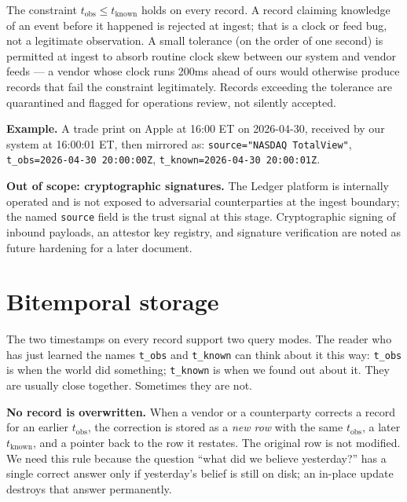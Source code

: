 \documentclass[11pt,a4paper]{article}
\begin{document}
The constraint $t_\text{obs} \le t_\text{known}$ holds on every record. A record claiming knowledge of an event before it happened is rejected at ingest; that is a clock or feed bug, not a legitimate observation. A small tolerance (on the order of one second) is permitted at ingest to absorb routine clock skew between our system and vendor feeds --- a vendor whose clock runs 200ms ahead of ours would otherwise produce records that fail the constraint legitimately. Records exceeding the tolerance are quarantined and flagged for operations review, not silently accepted.

\textbf{Example.} A trade print on Apple at 16:00 ET on 2026-04-30, received by our system at 16:00:01 ET, then mirrored as: \texttt{source="NASDAQ TotalView"}, \texttt{t\_obs=2026-04-30 20:00:00Z}, \texttt{t\_known=2026-04-30 20:00:01Z}.

\textbf{Out of scope: cryptographic signatures.} The Ledger platform is internally operated and is not exposed to adversarial counterparties at the ingest boundary; the named \texttt{source} field is the trust signal at this stage. Cryptographic signing of inbound payloads, an attestor key registry, and signature verification are noted as future hardening for a later document.

\section{Bitemporal storage}\label{sec:bitemporal}

The two timestamps on every record support two query modes. The reader who has just learned the names \texttt{t\_obs} and \texttt{t\_known} can think about it this way: \texttt{t\_obs} is when the world did something; \texttt{t\_known} is when we found out about it. They are usually close together. Sometimes they are not.

\textbf{No record is overwritten.} When a vendor or a counterparty corrects a record for an earlier $t_\text{obs}$, the correction is stored as a \emph{new row} with the same $t_\text{obs}$, a later $t_\text{known}$, and a pointer back to the row it restates. The original row is not modified. We need this rule because the question ``what did we believe yesterday?'' has a single correct answer only if yesterday's belief is still on disk; an in-place update destroys that answer permanently.
\end{document}
